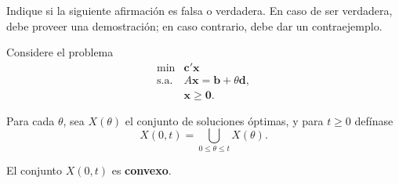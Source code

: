 Indique si la siguiente afirmación es falsa o verdadera. En caso de ser verdadera, debe proveer una demostración; en caso contrario, debe dar un contraejemplo.

Considere el problema
$$
\begin{array}{ll}
\min & \mathbf{c}'\mathbf{x} \\
\text{s.a.} & A\mathbf{x}=\mathbf{b}+\theta \mathbf{d},\\
& \mathbf{x}\geq \mathbf{0}.
\end{array}
$$ 

Para cada $\theta$, sea $X(\theta)$ el conjunto de soluciones óptimas, y para $t\ge 0$ defínase
$$
X(0,t)=\bigcup_{0\le \theta\le t} X(\theta).
$$

El conjunto $X(0,t)$ es \textbf{convexo}.
